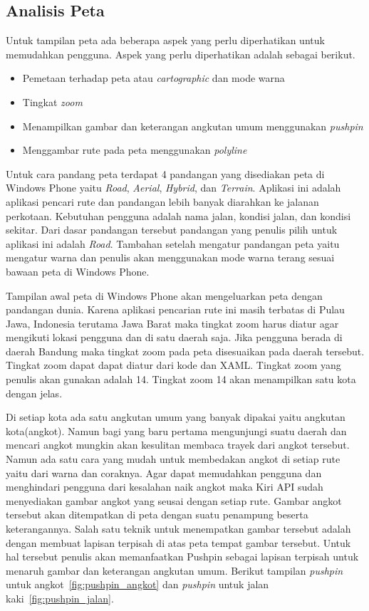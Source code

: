 \subsection{Analisis Peta}
\label{lab:Analisis Peta}
\hspace{0.5cm} Untuk tampilan peta ada beberapa aspek yang perlu diperhatikan untuk memudahkan pengguna. Aspek yang perlu diperhatikan adalah sebagai berikut.
\begin{itemize}
	\item Pemetaan terhadap peta atau \textit{cartographic} dan mode warna
	\item Tingkat \textit{zoom}
	\item Menampilkan gambar dan keterangan angkutan umum menggunakan \textit{pushpin}
	\item Menggambar rute pada peta menggunakan \textit{polyline}
\end{itemize}

Untuk cara pandang peta terdapat 4 pandangan yang disediakan peta di Windows Phone yaitu \textit{Road}, \textit{Aerial}, \textit{Hybrid}, dan \textit{Terrain}. Aplikasi ini adalah aplikasi pencari rute dan pandangan lebih banyak diarahkan ke jalanan perkotaan. Kebutuhan pengguna adalah nama jalan, kondisi jalan, dan kondisi sekitar. Dari dasar pandangan tersebut pandangan yang penulis pilih untuk aplikasi ini adalah \textit{Road}. Tambahan setelah mengatur pandangan peta yaitu mengatur warna dan penulis akan menggunakan mode warna terang sesuai bawaan peta di Windows Phone.

Tampilan awal peta di Windows Phone akan mengeluarkan peta dengan pandangan dunia. Karena aplikasi pencarian rute ini masih terbatas di Pulau Jawa, Indonesia terutama Jawa Barat maka tingkat zoom harus diatur agar mengikuti lokasi pengguna dan di satu daerah saja. Jika pengguna berada di daerah Bandung maka tingkat zoom pada peta disesuaikan pada daerah tersebut. Tingkat zoom dapat dapat diatur dari kode dan XAML. Tingkat zoom yang penulis akan gunakan adalah 14. Tingkat zoom 14 akan menampilkan satu kota dengan jelas.

Di setiap kota ada satu angkutan umum yang banyak dipakai yaitu angkutan kota(angkot). Namun bagi yang baru pertama mengunjungi suatu daerah dan mencari angkot mungkin akan kesulitan membaca trayek dari angkot tersebut. Namun ada satu cara yang mudah untuk membedakan angkot di setiap rute yaitu dari warna dan coraknya. Agar dapat memudahkan pengguna dan menghindari pengguna dari kesalahan naik angkot maka Kiri API sudah menyediakan gambar angkot yang seusai dengan setiap rute. Gambar angkot tersebut akan ditempatkan di peta dengan suatu penampung beserta keterangannya. Salah satu teknik untuk menempatkan gambar tersebut adalah dengan membuat lapisan terpisah di atas peta tempat gambar tersebut. Untuk hal tersebut penulis akan memanfaatkan Pushpin sebagai lapisan terpisah untuk menaruh gambar dan keterangan angkutan umum. Berikut tampilan \textit{pushpin} untuk angkot~\ref{fig:pushpin_angkot} dan \textit{pushpin} untuk jalan kaki~\ref{fig:pushpin_jalan}.

